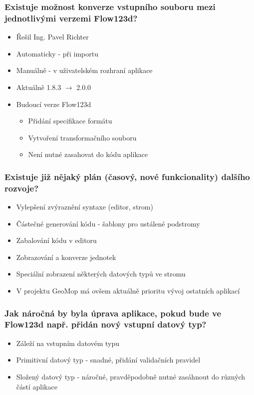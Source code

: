 \begin{frame}[noframenumbering]
\begin{center}
	\frametitle{Existuje možnost konverze vstupního souboru mezi jednotlivými verzemi Flow123d?}
	\begin{itemize}[<+->]
		\item Řešil Ing. Pavel Richter
		\item Automaticky - při importu
		\item Manuálně - v uživatelském rozhraní aplikace
		\item Aktuálně 1.8.3 $\rightarrow$ 2.0.0
		\item Budoucí verze Flow123d
		\begin{itemize}
			\item Přidání specifikace formátu
			\item Vytvoření transformačního souboru
			\item Není nutné zasahovat do kódu aplikace
		\end{itemize}
	\end{itemize}
\end{center}
\end{frame}

\begin{frame}[noframenumbering]
\begin{center}
	\frametitle{Existuje již nějaký plán (časový, nové funkcionality) dalšího rozvoje?}
	\begin{itemize}[<+->]
		\item Vylepšení zvýraznění syntaxe (editor, strom)
		\item Částečné generování kódu - šablony pro ustálené podstromy
		\item Zabalování kódu v editoru
		\item Zobrazování a konverze jednotek
		\item Speciální zobrazení některých datových typů ve stromu
		\item V projektu GeoMop má ovšem aktuálně prioritu vývoj ostatních aplikací
	\end{itemize}
\end{center}
\end{frame}

\begin{frame}[noframenumbering]
\begin{center}
	\frametitle{Jak náročná by byla úprava aplikace, pokud bude ve Flow123d např. přidán nový vstupní datový typ?}
	\begin{itemize}[<+->]
		\item Záleží na vstupním datovém typu
		\item Primitivní datový typ - snadné, přidání validačních pravidel
		\item Složený datový typ - náročné, pravděpodobně nutné zasáhnout do různých částí aplikace
	\end{itemize}
\end{center}
\end{frame}



